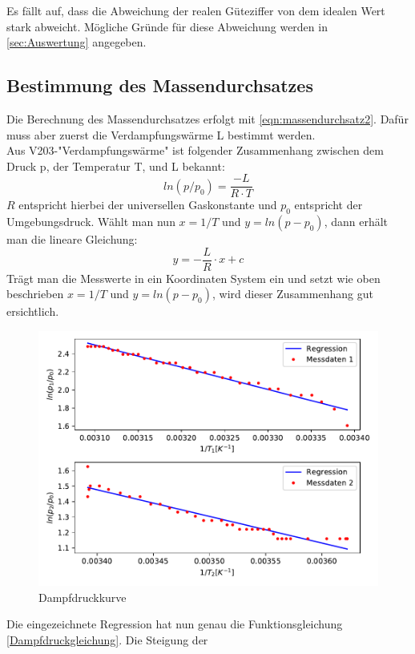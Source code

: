 Es fällt auf, dass die Abweichung der realen Güteziffer von dem idealen Wert stark abweicht. 
Mögliche Gründe für diese Abweichung werden in \ref{sec:Auswertung} angegeben.

\subsection{Bestimmung des Massendurchsatzes}
Die Berechnung des Massendurchsatzes erfolgt mit \eqref{eqn:massendurchsatz2}. Dafür muss aber zuerst die 
Verdampfungswärme L bestimmt werden. 
\\
Aus V203-"Verdampfungswärme" ist folgender Zusammenhang zwischen dem Druck p, der Temperatur T, und L bekannt:
\begin{equation}
  ln(p/p_0)=\frac{-L}{R \cdot T}
\end{equation}
$R$ entspricht hierbei der universellen Gaskonstante und $p_0$ entspricht der Umgebungsdruck.
Wählt man nun $x=1/T$ und $y=ln(p-p_0)$, dann erhält man die lineare Gleichung:
\begin{equation}
  y=-\frac{L}{R}\cdot x+c \label{Dampfdruckgleichung}
\end{equation}
Trägt man die Messwerte in ein Koordinaten System ein und setzt wie oben beschrieben $x=1/T$ und $y=ln(p-p_0)$,
wird dieser Zusammenhang gut ersichtlich.
\begin{figure}
  \centering
  \includegraphics[scale = 0.75]{Druckverlaeufe.pdf}
  \caption{Dampfdruckkurve}
  \label{fig:Dampfdruckkurve}
\end{figure}
Die eingezeichnete Regression hat nun genau die Funktionsgleichung \eqref{Dampfdruckgleichung}. Die Steigung der 
